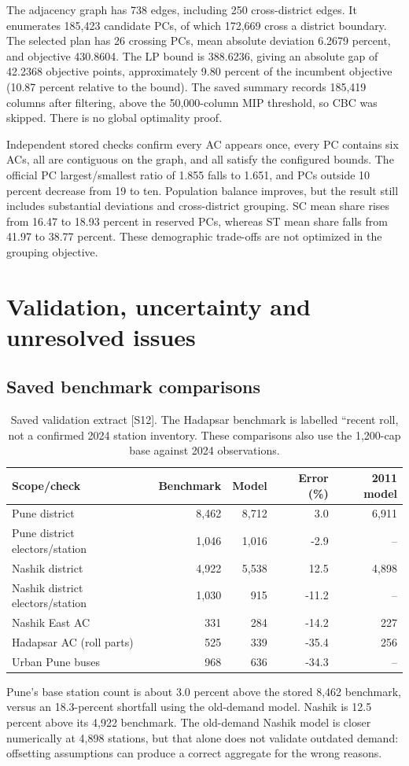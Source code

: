 \documentclass[11pt,a4paper,oneside]{report}
\newcommand{\source}[1]{\par\nopagebreak[4]{\footnotesize\color{teal}Evidence: #1.}\par}
\begin{document}
The adjacency graph has 738 edges, including 250 cross-district edges. It enumerates 185,423 candidate PCs, of which 172,669 cross a district boundary. The selected plan has 26 crossing PCs, mean absolute deviation 6.2679 percent, and objective 430.8604. The LP bound is 388.6236, giving an absolute gap of 42.2368 objective points, approximately 9.80 percent of the incumbent objective (10.87 percent relative to the bound). The saved summary records 185,419 columns after filtering, above the 50,000-column MIP threshold, so CBC was skipped. There is no global optimality proof.

Independent stored checks confirm every AC appears once, every PC contains six ACs, all are contiguous on the graph, and all satisfy the configured bounds. The official PC largest/smallest ratio of 1.855 falls to 1.651, and PCs outside 10 percent decrease from 19 to ten. Population balance improves, but the result still includes substantial deviations and cross-district grouping. SC mean share rises from 16.47 to 18.93 percent in reserved PCs, whereas ST mean share falls from 41.97 to 38.77 percent. These demographic trade-offs are not optimized in the grouping objective.
\source{[S13], [S14]}

\chapter{Validation, uncertainty and unresolved issues}
\section{Saved benchmark comparisons}
\begin{table}[htbp]\centering
\small
\setlength{\tabcolsep}{5pt}
\caption{Saved validation extract [S12]. The Hadapsar benchmark is labelled ``recent roll, not a confirmed 2024 station inventory. These comparisons also use the 1,200-cap base against 2024 observations.}
\begin{tabular}{p{5.2cm}rrrr}
\toprule
Scope/check & Benchmark & Model & Error (\%) & 2011 model\\
\midrule
Pune district & 8,462 & 8,712 & 3.0 & 6,911\\
Pune district electors/station & 1,046 & 1,016 & -2.9 & --\\
Nashik district & 4,922 & 5,538 & 12.5 & 4,898\\
Nashik district electors/station & 1,030 & 915 & -11.2 & --\\
Nashik East AC & 331 & 284 & -14.2 & 227\\
Hadapsar AC (roll parts) & 525 & 339 & -35.4 & 256\\
Urban Pune buses & 968 & 636 & -34.3 & --\\
\bottomrule\end{tabular}
\end{table}
Pune's base station count is about 3.0 percent above the stored 8,462 benchmark, versus an 18.3-percent shortfall using the old-demand model. Nashik is 12.5 percent above its 4,922 benchmark. The old-demand Nashik model is closer numerically at 4,898 stations, but that alone does not validate outdated demand: offsetting assumptions can produce a correct aggregate for the wrong reasons.
\end{document}
